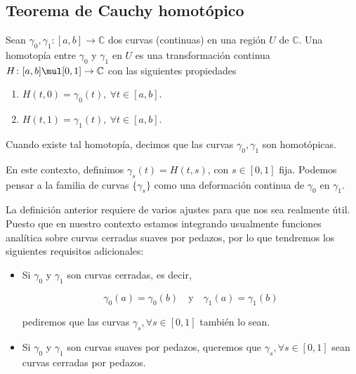 \documentclass[../main.tex]{subfiles}
\begin{document}
\subsection{Teorema de Cauchy homotópico}

\begin{definition}
    Sean \(\gamma_{0},\gamma_{1} \colon [a, b] \to \mathbb{C}\) dos curvas
    (continuas) en
    una región \(U\) de \(\mathbb{C}\). Una homotopía entre \(\gamma_{0}\) y
    \(\gamma_{1}\) en \(U\) es una transformación continua \(H \colon [a, b] \mul [0, 1]
    \to \mathbb{C}\) con las siguientes propiedades

    \begin{enumerate}
        \item \(H(t, 0) = \gamma_{0}(t),\medspace \forall t\in [a, b]\).
        \item \(H(t, 1) = \gamma_{1}(t),\medspace \forall t\in [a, b]\).
    \end{enumerate}

    Cuando existe tal homotopía, decimos que las curvas \(\gamma_{0},\gamma_{1}\) son
    homotópicas.
\end{definition}

En este contexto, definimos \(\gamma_{s}(t) = H(t, s)\), con \(s\in [0, 1]\) fija.
Podemos pensar a la familia de curvas \(\{\gamma_{s}\}\) como una deformación continua
de \(\gamma_{0}\) en \(\gamma_{1}\).

\begin{remark}
    La definición anterior requiere de varios ajustes para que nos sea realmente útil.
    Puesto que en nuestro contexto estamos integrando usualmente funciones analítica
    sobre curvas cerradas suaves por pedazos, por lo que tendremos los siguientes
    requisitos adicionales:

    \begin{itemize}
        \item Si \(\gamma_{0}\) y \(\gamma_{1}\) son curvas cerradas, es decir,

            \begin{equation*}
                \gamma_{0}(a) = \gamma_{0}(b)\quad \text{y}\quad
                \gamma_{1}(a) = \gamma_{1}(b)
            \end{equation*}

            pediremos que las curvas \(\gamma_{s}, \forall s\in [0, 1]\)
            también lo sean.

        \item Si \(\gamma_{0}\) y \(\gamma_{1}\) son curvas suaves por
            pedazos, queremos que
            \(\gamma_{s}, \forall s\in [0, 1]\) sean curvas cerradas por pedazos.
    \end{itemize}
\end{remark}
\end{document}
